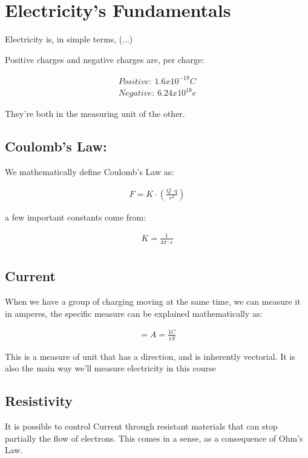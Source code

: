 \documentclass[11pt,fleqn]{book} %
\begin{document}
\chapter{Electricity's Fundamentals}

Electricity is, in simple terms, (...)

Positive charges and negative charges are, per charge:

\begin{gather}
    Positive: \ 1.6x10^{-19}C \\
    Negative: \ 6.24x10^{18}e
\end{gather}

They're both in the measuring unit of the other.

\section{Coulomb's Law:}

We mathematically define Coulomb's Law as:

\begin{gather}
    F = K \cdot (\frac{Q\cdot q}{r^2})
\end{gather}

a few important constants come from:

\begin{gather}
    K = \frac{1}{4\pi\cdot \epsilon}\\
\end{gather}

\section{Current}

When we have a group of charging moving at the same time, we can measure it in amperes, the specific 
measure can be explained mathematically as:

\begin{gather}
    [I] = A = \frac{1C}{1S}
\end{gather}

This is a measure of unit that has a direction, and is inherently vectorial.
It is also the main way we'll measure electricity in this course

\section{Resistivity}

It is possible to control Current through resistant materials that can stop partially the flow of electrons. 
This comes in a sense, as a consequence of Ohm's Law. 
\end{document}
